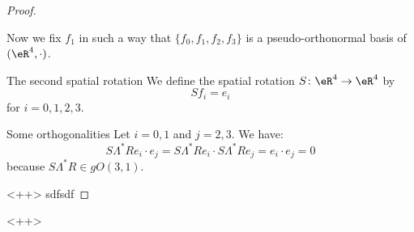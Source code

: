 \begin{proof}
\begin{subproof}
\begin{equation}
            \end{equation}
            Now we fix \( f_1\) in such a way that \( \{ f_0,f_1,f_2,f_3 \}\) is a pseudo-orthonormal basis of \( (\eR^4,\cdot)\).
        \item[The second spatial rotation]
            We define the spatial rotation \( S\colon \eR^4\to \eR^4\) by
            \begin{equation}
                Sf_i=e_i
            \end{equation}
            for \( i=0,1,2,3\).
        \item[Some orthogonalities]
            Let \( i=0,1\) and \( j=2,3\). We have:
            \begin{equation}
                S\Lambda^*Re_i\cdot e_j=S\Lambda^*Re_i\cdot S\Lambda^*Re_j=e_i\cdot e_j=0
            \end{equation}
            because \( S\Lambda^*R\in gO(3,1)\).

    \end{subproof}
            <++>
            sdfsdf 
\end{proof}
<++>

